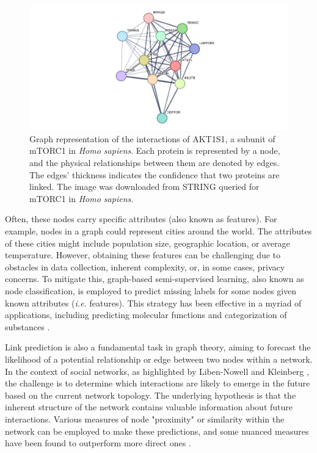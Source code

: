 \documentclass[
11pt, %
oneside, %
english, %
singlespacing, %
headsepline, %
chapterinoneline, %
]{MastersDoctoralThesis} %
\begin{document}
\begin{figure}[h]
	\centering
	\includegraphics[scale=0.5]{figure/mtor}
	\caption{Graph representation of the interactions of AKT1S1, a subunit of mTORC1 in \textit{Homo sapiens}. Each protein is represented by a node, and the physical relationships between them are denoted by edges. The edges' thickness indicates the confidence that two proteins are linked. The image was downloaded from STRING \cite{szklarczykSTRINGV10Protein2015} queried for mTORC1 in \textit{Homo sapiens}.}
	\label{fig:mTOR}
\end{figure}

Often, these nodes carry specific attributes (also known as features). For example, nodes in a graph could represent cities around the world. The attributes of these cities might include population size, geographic location, or average temperature. However, obtaining these features can be challenging due to obstacles in data collection, inherent complexity, or, in some cases, privacy concerns. To mitigate this, graph-based semi-supervised learning, also known as node classification, is employed to predict missing labels for some nodes given known attributes (\textit{i.e.} features). This strategy has been effective in a myriad of applications, including predicting molecular functions and categorization of substances \cite{NIPS2016_390e9825, liDeeperInsightsGraph2018}.

Link prediction is also a fundamental task in graph theory, aiming to forecast the likelihood of a potential relationship or edge between two nodes within a network. In the context of social networks, as highlighted by Liben-Nowell and Kleinberg \cite{liben-nowellLinkPredictionProblem2003}, the challenge is to determine which interactions are likely to emerge in the future based on the current network topology. The underlying hypothesis is that the inherent structure of the network contains valuable information about future interactions. Various measures of node "proximity" or similarity within the network can be employed to make these predictions, and some nuanced measures have been found to outperform more direct ones \cite{zhangLinkPredictionBased2018}.
\end{document}
